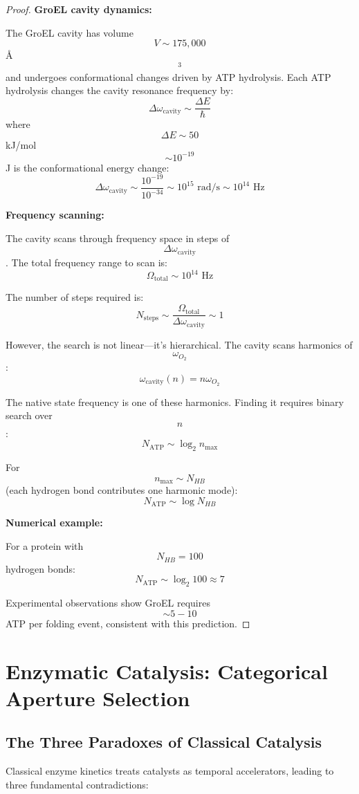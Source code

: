 \documentclass[12pt,a4paper]{article}
\begin{document}
\begin{proof}
\textbf{GroEL cavity dynamics:}

The GroEL cavity has volume $$V \sim 175,000$$ Å$$^3$$ and undergoes conformational changes driven by ATP hydrolysis. Each ATP hydrolysis changes the cavity resonance frequency by:
$$
\Delta\omega_{\text{cavity}} \sim \frac{\Delta E}{\hbar}
$$
where $$\Delta E \sim 50$$ kJ/mol $$\sim 10^{-19}$$ J is the conformational energy change:
$$
\Delta\omega_{\text{cavity}} \sim \frac{10^{-19}}{10^{-34}} \sim 10^{15} \text{ rad/s} \sim 10^{14} \text{ Hz}
$$

\textbf{Frequency scanning:}

The cavity scans through frequency space in steps of $$\Delta\omega_{\text{cavity}}$$. The total frequency range to scan is:
$$
\Omega_{\text{total}} \sim 10^{14} \text{ Hz}
$$

The number of steps required is:
$$
N_{\text{steps}} \sim \frac{\Omega_{\text{total}}}{\Delta\omega_{\text{cavity}}} \sim 1
$$

However, the search is not linear—it's hierarchical. The cavity scans harmonics of $$\omega_{O_2}$$:
$$
\omega_{\text{cavity}}(n) = n \omega_{O_2}
$$

The native state frequency is one of these harmonics. Finding it requires binary search over $$n$$:
$$
N_{\text{ATP}} \sim \log_2 n_{\max}
$$

For $$n_{\max} \sim N_{HB}$$ (each hydrogen bond contributes one harmonic mode):
$$
N_{\text{ATP}} \sim \log N_{HB}
$$

\textbf{Numerical example:}

For a protein with $$N_{HB} = 100$$ hydrogen bonds:
$$
N_{\text{ATP}} \sim \log_2 100 \approx 7
$$

Experimental observations show GroEL requires $$\sim 5-10$$ ATP per folding event, consistent with this prediction.
\end{proof}

\section{Enzymatic Catalysis: Categorical Aperture Selection}

\subsection{The Three Paradoxes of Classical Catalysis}

Classical enzyme kinetics treats catalysts as temporal accelerators, leading to three fundamental contradictions:
\end{document}
